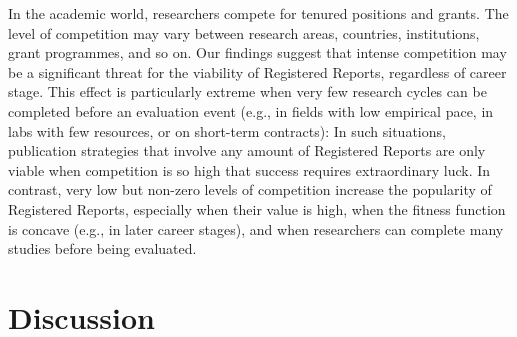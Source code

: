 \documentclass[
  ,man,mask,floatsintext]{apa6}
\begin{document}
In the academic world, researchers compete for tenured positions and grants.
The level of competition may vary between research areas, countries, institutions, grant programmes, and so on.
Our findings suggest that intense competition may be a significant threat for the viability of Registered Reports, regardless of career stage.
This effect is particularly extreme when very few research cycles can be completed before an evaluation event (e.g., in fields with low empirical pace, in labs with few resources, or on short-term contracts):
In such situations, publication strategies that involve any amount of Registered Reports are only viable when competition is so high that success requires extraordinary luck.
In contrast, very low but non-zero levels of competition increase the popularity of Registered Reports, especially when their value is high, when the fitness function is concave (e.g., in later career stages), and when researchers can complete many studies before being evaluated.

\hypertarget{discussion}{%
\section{Discussion}\label{discussion}}
\end{document}
